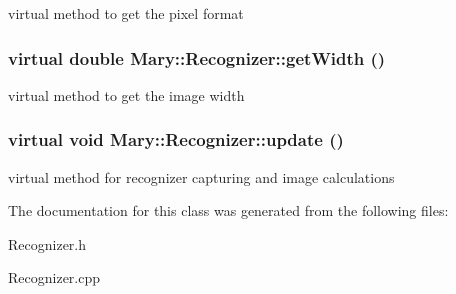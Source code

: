 virtual method to get the pixel format \hypertarget{class_mary_1_1_recognizer_3f84cbc919ffbf311d347a51b0ae559b}{
\subsubsection[getWidth]{\setlength{\rightskip}{0pt plus 5cm}virtual double Mary::Recognizer::getWidth ()}}
\label{class_mary_1_1_recognizer_3f84cbc919ffbf311d347a51b0ae559b}


virtual method to get the image width \hypertarget{class_mary_1_1_recognizer_8a5f92a1dbb5806bc28447ffef1b9062}{
\subsubsection[update]{\setlength{\rightskip}{0pt plus 5cm}virtual void Mary::Recognizer::update ()}}
\label{class_mary_1_1_recognizer_8a5f92a1dbb5806bc28447ffef1b9062}


virtual method for recognizer capturing and image calculations 

The documentation for this class was generated from the following files:\begin{CompactItemize}
\item 
Recognizer.h\item 
Recognizer.cpp\end{CompactItemize}
